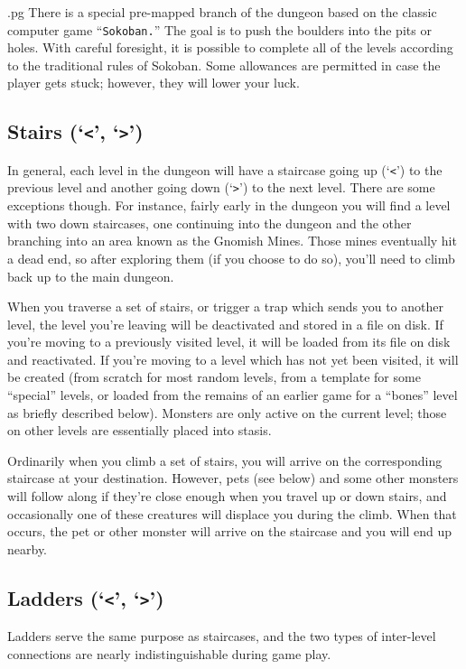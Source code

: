 .pg
There is a special pre-mapped branch of the dungeon based on the
classic computer game ``{\tt Sokoban.}''  The goal is to push the boulders
into the pits or holes.  With careful foresight, it is possible to
complete all of the levels according to the traditional rules of
Sokoban.  Some allowances are permitted in case the player gets stuck;
however, they will lower your luck.
\subsection*{Stairs (`{\tt <}', `{\tt >}')}

In general, each level in the dungeon will have a staircase going up
(`{\tt <}') to the previous level and another going down (`{\tt >}')
to the next
level.  There are some exceptions though.  For instance, fairly early
in the dungeon you will find a level with two down staircases, one
continuing into the dungeon and the other branching into an area
known as the Gnomish Mines.  Those mines eventually hit a dead end,
so after exploring them (if you choose to do so), you'll need to
climb back up to the main dungeon.

When you traverse a set of stairs, or trigger a trap which sends you
to another level, the level you're leaving will be deactivated and
stored in a file on disk.  If you're moving to a previously visited
level, it will be loaded from its file on disk and reactivated.  If
you're moving to a level which has not yet been visited, it will be
created (from scratch for most random levels, from a template for
some ``special'' levels, or loaded from the remains of an earlier game
for a ``bones'' level as briefly described below).  Monsters are only
active on the current level; those on other levels are essentially
placed into stasis.

Ordinarily when you climb a set of stairs, you will arrive on the
corresponding staircase at your destination.  However, pets (see below)
and some other monsters will follow along if they're close enough when
you travel up or down stairs, and occasionally one of these creatures
will displace you during the climb.  When that occurs, the pet or other
monster will arrive on the staircase and you will end up nearby.
\subsection*{Ladders (`{\tt <}', `{\tt >}')}

Ladders serve the same purpose as staircases, and the two types of
inter-level connections are nearly indistinguishable during game play.
